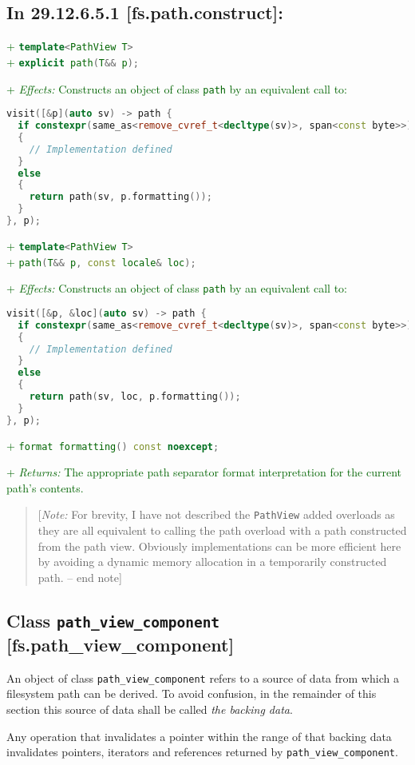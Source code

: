 \documentclass[11pt]{article}
\newcommand{\code}[2][cpp]{\lstinline[language=#1,basicstyle=\small\ttfamily]{#2}}
\newcommand{\desc}[1]{\textit{#1}}
\newcommand{\effects}{\desc{Effects: }}
\newcommand{\returns}{\desc{Returns: }}
\newcommand{\note}[1]{\begin{quote}[\textit{Note:} #1 -- end note]\end{quote}}
\newcommand{\tsref}[2]{\subsection*{In #2 \textbf{[#1]}:}}
\newcommand{\tsreplace}[3]{\textcolor{red}{\sout{#1}}#2\textcolor{darkgreen}{#3}}
\begin{document}
\tsref{fs.path.construct}{29.12.6.5.1}

\tsreplace{}{}{+ \code{template<PathView T>}}\\
\tsreplace{}{}{+ \code{explicit path(T&& p);}}

\tsreplace{}{}{+ \effects Constructs an object of class \code{path} by an equivalent call to:}
\begin{lstlisting}[language=cpp]
visit([&p](auto sv) -> path {
  if constexpr(same_as<remove_cvref_t<decltype(sv)>, span<const byte>>)
  {
    // Implementation defined
  }
  else
  {
    return path(sv, p.formatting());
  }
}, p);
\end{lstlisting}

\tsreplace{}{}{+ \code{template<PathView T>}}\\
\tsreplace{}{}{+ \code{path(T&& p, const locale& loc);}}

\tsreplace{}{}{+ \effects Constructs an object of class \code{path} by an equivalent call to:}
\begin{lstlisting}[language=cpp]
visit([&p, &loc](auto sv) -> path {
  if constexpr(same_as<remove_cvref_t<decltype(sv)>, span<const byte>>)
  {
    // Implementation defined
  }
  else
  {
    return path(sv, loc, p.formatting());
  }
}, p);
\end{lstlisting}

\tsreplace{}{}{+ \code{format formatting() const noexcept;}}

\tsreplace{}{}{+ \returns The appropriate path separator format interpretation for the current path's contents.}

\note{For brevity, I have not described the \code{PathView} added overloads as they are all equivalent to calling the path overload with a path constructed from the path view. Obviously implementations can be more efficient here by avoiding a dynamic memory allocation in a temporarily constructed path.}

\color{darkgreen}

\subsection*{Class \code{path_view_component} [fs.path\_view\_component]}

An object of class \code{path_view_component} refers to a source of data from which a filesystem path can be derived. To avoid confusion, in the remainder of this section this source of data shall be called \emph{the backing data}.

Any operation that invalidates a pointer within the range of that backing data invalidates pointers, iterators and references returned by \code{path_view_component}.
\end{document}
